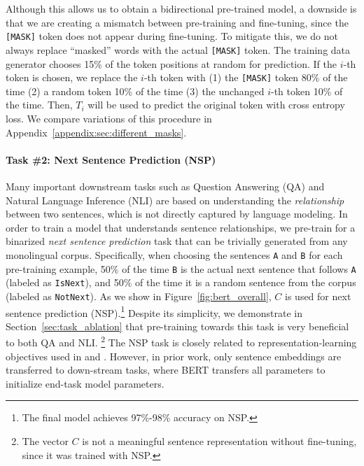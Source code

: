 \documentclass[11pt,a4paper]{article}
\begin{document}
Although this allows us to obtain a bidirectional pre-trained model, a downside is that we are creating a mismatch between pre-training and fine-tuning, since the {\tt [MASK]} token does not appear during fine-tuning. To mitigate this, we do not always replace ``masked'' words with the actual {\tt [MASK]} token. The training data generator chooses 15\% of the token positions at random for prediction. If the $i$-th token is chosen, we replace the $i$-th token with (1) the {\tt [MASK]} token 80\% of the time (2) a random token 10\% of the time (3) the unchanged $i$-th token 10\% of the time. Then, $T_i$ will be used to predict the original token with cross entropy loss.
We compare variations of this procedure in Appendix~\ref{appendix:sec:different_masks}.
\vspace{.2cm}

\paragraph{Task \#2: Next Sentence Prediction (NSP)}
Many important downstream tasks such as Question Answering (QA) and Natural Language Inference (NLI) are based on understanding the {\it relationship} between two sentences, which is not directly captured by language modeling. In order to train a model that understands sentence relationships, we pre-train for a binarized {\it next sentence prediction} task that can be trivially generated from any monolingual corpus. Specifically, when choosing the sentences {\tt A} and {\tt B} for each pre-training example, 50\% of the time {\tt B} is the actual next sentence that follows {\tt A} (labeled
 as {\tt {\small IsNext}}), and 50\% of the time it is a random sentence from the corpus
 (labeled as {\tt {\small NotNext}}). 
As we show in Figure~\ref{fig:bert_overall}, $C$ is used for  next sentence prediction (NSP).\footnote{The final model achieves 97\%-98\% accuracy on NSP.} Despite its simplicity, we demonstrate in Section~\ref{sec:task_ablation} that pre-training towards this task is very beneficial to both QA and NLI.
\footnote{The vector $C$ is not a meaningful sentence representation without fine-tuning, since it was trained with NSP.}
The NSP task is closely related to representation-learning objectives used in \citet{DBLP:journals/corr/JerniteBS17} and \citet{logeswaran2018an}. However, in prior work, only sentence embeddings are transferred to down-stream tasks, where BERT transfers all parameters to initialize end-task model parameters.
\end{document}
